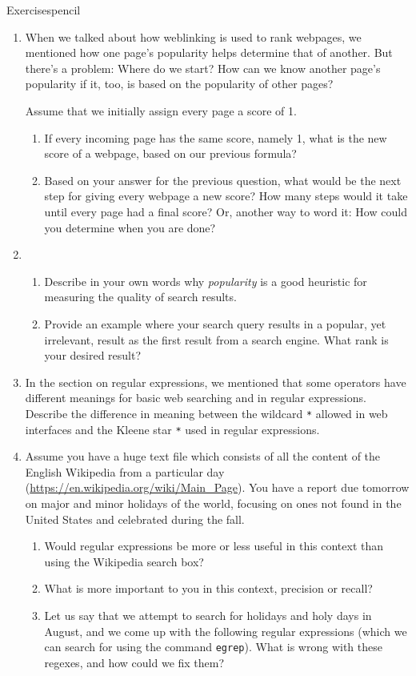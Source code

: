 \begin{tblsfilledsymbol}{Exercises}{pencil}
\begin{enumerate}
\item  When we talked about how weblinking is used to
  rank webpages, we mentioned how one page's popularity helps
  determine that of another.  But there's a problem: Where do we start?  How
  can we know another page's popularity if it, too, is based on the popularity of  other pages?

  Assume that we initially assign every page a score of 1.
  \begin{enumerate}
  \item If every incoming page has the same score, namely 1, what is
    the new score of a webpage, based on our previous formula?
  \item Based on your answer for the previous question, what would be
    the next step for giving every webpage a new score?  How many
    steps would it take until every page had a final score?  Or,
    another way to word it: How could you determine when you are done?

  \end{enumerate}

\item 
  \begin{enumerate}
  \item Describe in your own words why \emph{popularity} is a good
    heuristic for measuring the quality of search results.
  \item Provide an example where your search query results in a
    popular, yet irrelevant, result as the first result from a search
    engine.  What rank is your desired result?
  \end{enumerate}

\item  In the section on regular expressions, we
  mentioned that some operators have different meanings for basic web
  searching and in regular expressions.  Describe the difference in
  meaning between the wildcard \texttt{*} allowed in web interfaces
  and the Kleene star \texttt{*} used in regular expressions.

\item Assume you have a huge text file which consists of
  all the content of the English Wikipedia from a particular day
  (\url{https://en.wikipedia.org/wiki/Main_Page}).  You have a report
  due tomorrow on major and minor holidays of the world, focusing on
  ones not found in the United States and celebrated during the fall.

  \begin{enumerate}
  \item Would regular expressions be more or less useful in this
    context than using the Wikipedia search box?
  \item What is more important to you in this context, precision or
    recall?
  \item Let us say that we attempt to search for holidays and holy
    days in August, and we come up with the following regular expressions (which we can search for using the command \verb#egrep#).  What
    is wrong with these regexes, and how could we fix them?


\end{enumerate}
\end{enumerate}
\end{tblsfilledsymbol}
